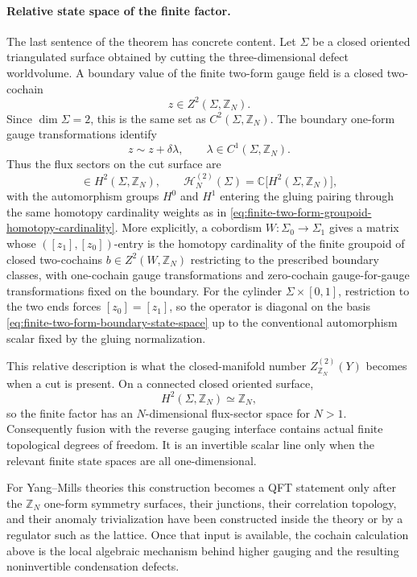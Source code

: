 \paragraph{Relative state space of the finite factor.}
The last sentence of the theorem has concrete content.  Let \(\Sigma\) be a
closed oriented triangulated surface obtained by cutting the three-dimensional
defect worldvolume.  A boundary value of the finite two-form gauge field is a
closed two-cochain
\[
  z\in Z^2(\Sigma,\mathbb Z_N).
\]
Since \(\dim \Sigma=2\), this is the same set as \(C^2(\Sigma,\mathbb Z_N)\).
The boundary one-form gauge transformations identify
\[
  z\sim z+\delta\lambda,\qquad
  \lambda\in C^1(\Sigma,\mathbb Z_N).
\]
Thus the flux sectors on the cut surface are
\begin{equation}
  [z]\in H^2(\Sigma,\mathbb Z_N),
  \qquad
  \mathcal H^{(2)}_N(\Sigma)
  =
  \mathbb C\bigl[H^2(\Sigma,\mathbb Z_N)\bigr],
  \label{eq:finite-two-form-boundary-state-space}
\end{equation}
with the automorphism groups \(H^0\) and \(H^1\) entering the gluing pairing
through the same homotopy cardinality weights as in
\eqref{eq:finite-two-form-groupoid-homotopy-cardinality}.  More explicitly, a
cobordism \(W:\Sigma_0\to\Sigma_1\) gives a matrix whose
\(([z_1],[z_0])\)-entry is the homotopy cardinality of the finite groupoid of
closed two-cochains \(b\in Z^2(W,\mathbb Z_N)\) restricting to the prescribed
boundary classes, with one-cochain gauge transformations and zero-cochain
gauge-for-gauge transformations fixed on the boundary.  For the cylinder
\(\Sigma\times[0,1]\), restriction to the two ends forces
\([z_0]=[z_1]\), so the operator is diagonal on the basis
\eqref{eq:finite-two-form-boundary-state-space} up to the conventional
automorphism scalar fixed by the gluing normalization.

This relative description is what the closed-manifold number
\(Z^{(2)}_{\mathbb Z_N}(Y)\) becomes when a cut is present.  On a connected
closed oriented surface,
\[
  H^2(\Sigma,\mathbb Z_N)\simeq \mathbb Z_N,
\]
so the finite factor has an \(N\)-dimensional flux-sector space for \(N>1\).
Consequently fusion with the reverse gauging interface contains actual finite
topological degrees of freedom.  It is an invertible scalar line only when the
relevant finite state spaces are all one-dimensional.

For Yang--Mills theories this construction becomes a QFT statement only after
the \(\mathbb Z_N\) one-form symmetry surfaces, their junctions, their
correlation topology, and their anomaly trivialization have been constructed
inside the theory or by a regulator such as the lattice.  Once that input is
available, the cochain calculation above is the local algebraic mechanism
behind higher gauging and the resulting noninvertible condensation defects.

